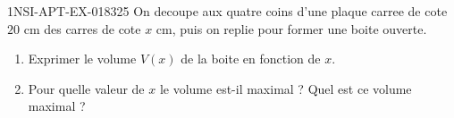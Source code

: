 \begin{exercice}{1NSI-APT-EX-018}{3}{25}
On decoupe aux quatre coins d'une plaque carree de cote $20$ cm des carres de cote $x$ cm, puis on replie pour former une boite ouverte.
\begin{enumerate}
  \item Exprimer le volume $V(x)$ de la boite en fonction de $x$.
  \item Pour quelle valeur de $x$ le volume est-il maximal ? Quel est ce volume maximal ?
\end{enumerate}

\end{exercice}
